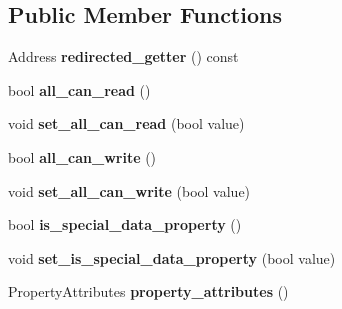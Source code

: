 \subsection*{Public Member Functions}
\begin{DoxyCompactItemize}
\item 
Address {\bfseries redirected\+\_\+getter} () const \hypertarget{classv8_1_1internal_1_1_accessor_info_af5366b96ec3b5d836dbc226478c36afc}{}\label{classv8_1_1internal_1_1_accessor_info_af5366b96ec3b5d836dbc226478c36afc}

\item 
bool {\bfseries all\+\_\+can\+\_\+read} ()\hypertarget{classv8_1_1internal_1_1_accessor_info_a15ee717df70fd30880f5a3e15a90b02a}{}\label{classv8_1_1internal_1_1_accessor_info_a15ee717df70fd30880f5a3e15a90b02a}

\item 
void {\bfseries set\+\_\+all\+\_\+can\+\_\+read} (bool value)\hypertarget{classv8_1_1internal_1_1_accessor_info_afc007f500afa962d19ef75d52de03c89}{}\label{classv8_1_1internal_1_1_accessor_info_afc007f500afa962d19ef75d52de03c89}

\item 
bool {\bfseries all\+\_\+can\+\_\+write} ()\hypertarget{classv8_1_1internal_1_1_accessor_info_acb963c18a2b77d7b79ebca64b8192a12}{}\label{classv8_1_1internal_1_1_accessor_info_acb963c18a2b77d7b79ebca64b8192a12}

\item 
void {\bfseries set\+\_\+all\+\_\+can\+\_\+write} (bool value)\hypertarget{classv8_1_1internal_1_1_accessor_info_a7845e45a30b59305f606d8b3dbbabb13}{}\label{classv8_1_1internal_1_1_accessor_info_a7845e45a30b59305f606d8b3dbbabb13}

\item 
bool {\bfseries is\+\_\+special\+\_\+data\+\_\+property} ()\hypertarget{classv8_1_1internal_1_1_accessor_info_a1593220a13db54879356273d2282bc59}{}\label{classv8_1_1internal_1_1_accessor_info_a1593220a13db54879356273d2282bc59}

\item 
void {\bfseries set\+\_\+is\+\_\+special\+\_\+data\+\_\+property} (bool value)\hypertarget{classv8_1_1internal_1_1_accessor_info_a371c23f5c55f35df10826494ed9fa469}{}\label{classv8_1_1internal_1_1_accessor_info_a371c23f5c55f35df10826494ed9fa469}

\item 
Property\+Attributes {\bfseries property\+\_\+attributes} ()\hypertarget{classv8_1_1internal_1_1_accessor_info_a13c8eb4416eee0482ef82e32c7df4ea6}{}\label{classv8_1_1internal_1_1_accessor_info_a13c8eb4416eee0482ef82e32c7df4ea6}


\end{DoxyCompactItemize}
